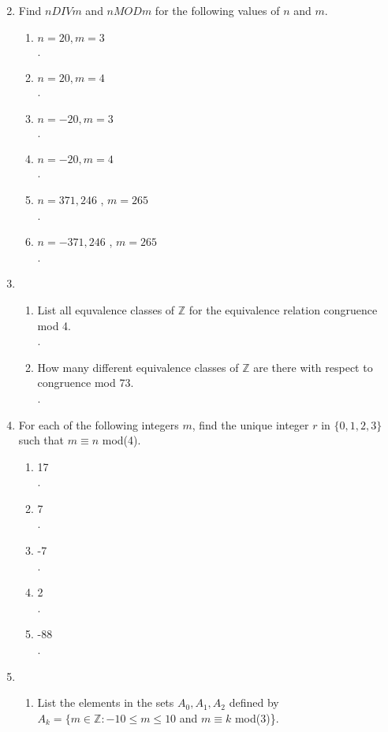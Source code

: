 \documentclass[11pt]{article}
\newcommand{\Z}{\mathbb{Z}}
\begin{document}
\begin{enumerate}
\setcounter{enumi}{1}
\item Find $n DIV m$ and $n MOD m$ for the following values of $n$ and $m$.
	\begin{enumerate}
	\item $n=20,m=3$\\
	.
	\item $n=20,m=4$\\
	.
	\item $n=-20,m=3$\\
	.
	\item $n=-20,m=4$\\
	.
	\item $n=371,246$ , $m=265$\\	
	.
	\item $n=-371,246$ , $m=265$\\	
	.
	\end{enumerate}
\setcounter{enumi}{3}
\item 
	\begin{enumerate}
	\item List all equvalence classes of $\Z$ for the equivalence relation congruence mod 4.\\
	.
	\item How many different equivalence classes of $\Z$ are there with respect to congruence mod 73.\\
	.
	\end{enumerate}
\item For each of the following integers $m$, find the unique integer $r$ in $\{0,1,2,3\}$ such that $m\equiv n$ mod(4).\\
	\begin{enumerate}
	\item 17\\
	.
	\item 7\\
	.
	\item -7\\
	.
	\item 2\\
	.
	\item -88\\
	.
	\end{enumerate}
\setcounter{enumi}{7}
\item
	\begin{enumerate}
	\item List the elements in the sets $A_0,A_1,A_2$ defined by\\
		$A_k=\{m\in\Z:-10\leq m\leq 10$ and $m\equiv k$ mod(3)\}.\\

\end{enumerate}
\end{enumerate}
\end{document}
